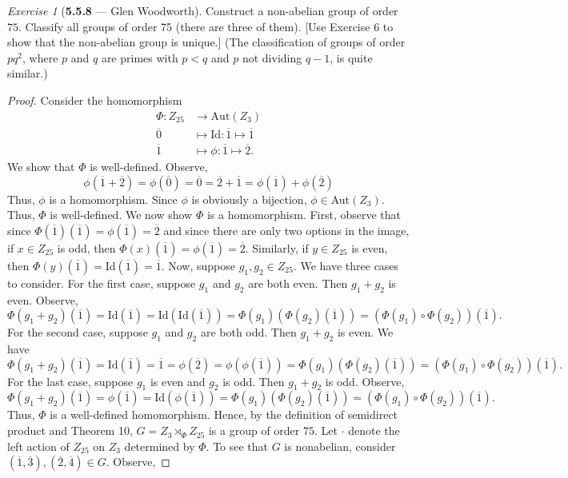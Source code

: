 \documentclass[12pt]{amsart}
\theoremstyle{remark}
\newtheorem*{exercise}{Exercise}%
\theoremstyle{mycomment}
\begin{document}
\begin{exercise}[\textbf{5.5.8} --- Glen Woodworth] Construct a non-abelian group of order $75$. Classify all groups of order 75 (there are three of them). [Use Exercise 6 to show that the non-abelian group is unique.] (The classification of groups of order $pq^2$, where $p$ and $q$ are primes with $p<q$ and $p$ not dividing $q-1$, is quite similar.)
  \begin{proof} Consider the homomorphism \begin{align*}\Phi:Z_{25}&\rightarrow\text{Aut}(Z_{3})\\
\overline{0}&\mapsto\text{Id}:\overline{1}\mapsto\overline{1}\\
\overline{1}&\mapsto \phi:\overline{1}\mapsto \overline{2}.
  \end{align*} 
  We show that $\Phi$ is well-defined. Observe,\[\phi(\overline{1}+\overline{2})=\phi(\overline{0})=\overline{0}=\overline{2}+\overline{1}=\phi(\overline{1})+\phi(\overline{2})\]
Thus, $\phi$ is a homomorphism. Since $\phi$ is obviously a bijection, $\phi\in$Aut$(Z_3)$. Thus, $\Phi$ is well-defined. We now show $\Phi$ is a homomorphism. First, observe that since $\Phi(\overline{1})(\overline{1})=\phi(\overline{1})=\overline{2}$ and since there are only two options in the image, if $x\in Z_{25}$ is odd, then $\Phi(x)(\overline{1})=\phi(\overline{1})=\overline{2}$. Similarly, if $y\in Z_{25}$ is even, then $\Phi(y)(\overline{1})=$Id$(\overline{1})=\overline{1}$. Now, suppose $g_1,g_2\in Z_{25}$. We have three cases to consider. For the first case, suppose $g_1$ and $g_2$ are both even. Then $g_1+g_2$ is even. Observe,\[
\Phi(g_1+g_2)(\overline{1})=\text{Id}(\overline{1})=\text{Id}(\text{Id}(\overline{1}))=\Phi(g_1)(\Phi(g_2)(\overline{1}))=(\Phi(g_1)\circ\Phi(g_2))(\overline{1}).\]
For the second case, suppose $g_1$ and $g_2$ are both odd. Then $g_1+g_2$ is even. We have
\[\Phi(g_1+g_2)(\overline{1})=\text{Id}(\overline{1})=\overline{1}=\phi(\overline{2})=\phi(\phi(\overline{1}))=\Phi(g_1)(\Phi(g_2)(\overline{1}))=(\Phi(g_1)\circ\Phi(g_2))(\overline{1}).\]
For the last case, suppose $g_1$ is even and $g_2$ is odd. Then $g_1+g_2$ is odd. Observe,
\[\Phi(g_1+g_2)(\overline{1})=\phi(\overline{1})=\text{Id}(\phi(\overline{1}))=\Phi(g_1)(\Phi(g_2)(\overline{1}))=(\Phi(g_1)\circ\Phi(g_2))(\overline{1}).\]
Thus, $\Phi$ is a well-defined homomorphism. Hence, by the definition of semidirect product and Theorem 10, $G=Z_3\rtimes_\Phi Z_{25}$ is a group of order $75$. Let $\cdot$ denote the left action of $Z_{25}$ on $Z_3$ determined by $\Phi.$ To see that $G$ is nonabelian, consider $(\overline{1},\overline{3}),(\overline{2},\overline{4})\in G$. Observe,

\end{proof}
\end{exercise}
\end{document}
